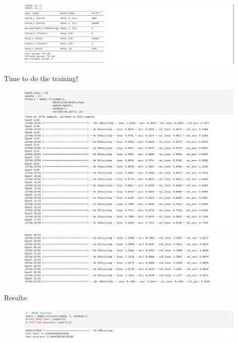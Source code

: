 \documentclass[11pt]{article}
\makeatletter
\def\maxwidth{\ifdim\Gin@nat@width>\linewidth\linewidth
    \else\Gin@nat@width\fi}
\let\Oldincludegraphics\includegraphics
\renewcommand{\includegraphics}[1]{\Oldincludegraphics[width=.8\maxwidth]{#1}}
\makeatother
\begin{document}
    \begin{figure}[htbp]
\centering
\includegraphics{build_CNN_model-V2-PARA.png}
\caption{}
\end{figure}

    Time to do the training!

    \begin{figure}[htbp]
\centering
\includegraphics{train_CNN-V2.png}
\caption{}
\end{figure}

    \begin{figure}[htbp]
\centering
\includegraphics{train_CNN-V2_2.png}
\caption{}
\end{figure}

    Results:

    \begin{figure}[htbp]
\centering
\includegraphics{results_CNN-V2.png}
\caption{}
\end{figure}
\end{document}
